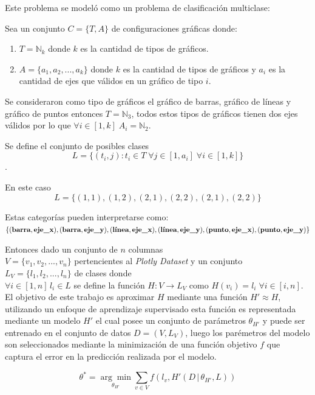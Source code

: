 \documentclass[a4paper,10pt,twocolumn]{article}
\begin{document}
	Este problema se model\'o como un problema de clasificaci\'on multiclase:
	
	Sea un conjunto $C = \{T, A\}$ de configuraciones gr\'aficas donde:
	\begin{enumerate}
		\item $T = \mathbb{N}_k$ donde $k$ es la cantidad de tipos de gr\'aficos.
		\item $A = \{a_1, a_2,...,a_k\}$ donde $k$ es la cantidad de tipos de gr\'aficos y $a_i$ es la
		cantidad de ejes que v\'alidos en un gr\'afico de tipo $i$.
	\end{enumerate}
		
	Se consideraron como tipo de gr\'aficos el gr\'afico de barras, gr\'afico de l\'ineas y gr\'afico de puntos entonces $T = \mathbb{N}_3$, 
	todos estos tipos de gr\'aficos tienen dos ejes v\'alidos por lo que $\forall i \in [1,k] \; A_i = \mathbb{N}_2$.

	Se define el conjunto de posibles clases
	$$L = \{ (t_i, j): t_i \in T \;\forall j \in [1, a_i] \;\forall i \in [1,k] \}$$.

	En este caso $$L = \{ (1,1),(1,2),(2,1),(2,2),(2,1),(2,2) \}$$
	
	Estas categor\'ias pueden interpretarse como:\\
	$\{(\textbf{barra}, \textbf{eje\_x}), (\textbf{barra}, \textbf{eje\_y}),
	(\textbf{l\'inea}, \textbf{eje\_x})\\, (\textbf{l\'inea}, \textbf{eje\_y}),
	(\textbf{punto}, \textbf{eje\_x}), (\textbf{punto}, \textbf{eje\_y}) \}$

	Entonces dado un conjunto de $n$ columnas\\ $V = \{v_1, v_2, ..., v_n \}$ pertencientes al \textit{Plotly Dataset} y 
	un conjunto $L_V = \{l_1, l_2,...,l_n\}$ de clases donde \\$\forall i \in [1,n]\, l_i \in L$ se define la funci\'on
	$H:V \to L_V$ como $H(v_i) = l_i \;\forall i \in [i,n]$. El objetivo de este trabajo es aproximar $H$ mediante
	una funci\'on $H' \approx H$, utilizando un enfoque de aprendizaje supervisado
	esta funci\'on es representada mediante un modelo $H'$ el cual posee un conjunto de
	par\'ametros $\theta_{H'}$ y puede ser entrenado en el conjunto de datos $D = (V,L_V)$, luego
	los par\'emetros del modelo son seleccionados mediante la minimizaci\'on de una funci\'on
	objetivo $f$ que captura el error en la predicci\'on realizada por el modelo.

	$$
		\theta^* = \underset{\theta_{H'}}{\arg \min} \underset{v \in V}{\sum} f(l_v, H'(D \,|\, \theta_{H'}, L))
	$$
\end{document}
